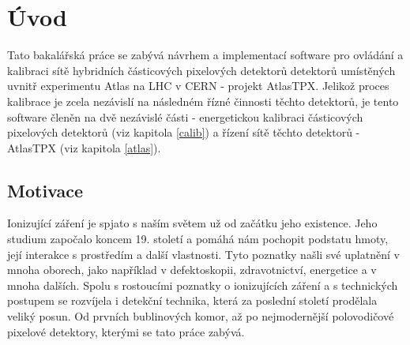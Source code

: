 

\chapter{Úvod}\label{chap01}
Tato bakalářská práce se zabývá návrhem a implementací software pro ovládání a kalibraci sítě hybridních částicových pixelových detektorů detektorů umístěných uvnitř experimentu Atlas na LHC v CERN - projekt AtlasTPX. 
Jelikož proces kalibrace je zcela nezávislí na následném řízné činnosti těchto detektorů, je tento software členěn na dvě nezávislé části - energetickou kalibraci částicových pixelových detektorů (viz kapitola \ref{calib}) a řízení sítě těchto detektorů - AtlasTPX (viz kapitola \ref{atlas}).

\todo

\section{Motivace}
Ionizující záření je spjato s naším světem už od začátku jeho existence. Jeho studium započalo koncem 19. století a pomáhá nám pochopit podstatu hmoty, její interakce s prostředím a další vlastnosti. Tyto poznatky našli své uplatnění v mnoha oborech, jako například v defektoskopii, zdravotnictví, energetice a v mnoha dalších. Spolu s rostoucími poznatky o ionizujících záření a s technických postupem se rozvíjela i detekční technika, která za poslední století prodělala veliký posun. Od prvních bublinových komor, až po nejmodernější polovodičové pixelové detektory, kterými se tato práce zabývá. 


	